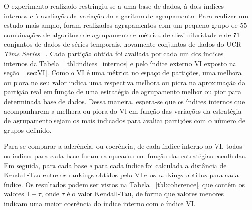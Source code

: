 
O experimento realizado restringiu-se a uma base  de dados, à dois índices internos e à avaliação da variação do algoritmo de agrupamento. Para realizar um estudo mais amplo, foram realizados agrupamentos com um pequeno grupo de $55$ combinações de algoritmo de agrupamento e métrica de dissimilaridade e de $71$ conjuntos de dados de séries temporais, novamente conjuntos de dados do UCR \emph{Time Series} ~\parencite{UCRArchive}. Cada partição obtida foi avaliada por cada um dos índices internos da Tabela ~\ref{tbl:indices_internos} e pelo índice externo VI exposto na seção ~\ref{sec:VI}. Como o VI é uma métrica no espaço de partições, uma melhora ou piora no seu valor indica uma respectiva melhora ou piora na aproximação da partição real em função de uma estratégia de agrupamento melhor ou pior para determinada base de dados. Dessa maneira, espera-se que os índices internos que acompanharem a melhora ou piora do VI em função das variações da estratégia de agrupamento sejam os mais indicados para avaliar partições com o número de grupos definido. 

Para se comparar a aderência, ou coerência, de cada índice interno ao VI, todos os índices para cada base foram ranqueados em função das estratégias escolhidas. Em seguida, para cada base e para cada índice foi calculada a distância de Kendall-Tau entre os rankings obtidos pelo VI e os rankings obtidos para cada índice. Os resultados podem ser vistos na Tabela ~\ref{tbl:coherence}, que contêm os valores $1-\tau$, onde $\tau$ é o valor Kendall-Tau, de forma que valores menores indicam uma maior coerência do índice interno com o índice VI.

